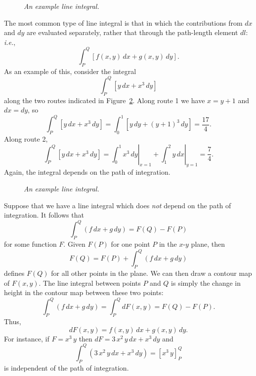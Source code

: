 \begin{figure}
\epsfysize=1.75in
\centerline{}
\caption{\em An example line integral.}\label{f11}
\end{figure}

The most common type of line integral is that in which the contributions from $dx$ and $dy$ are evaluated
separately, rather that through the path-length element $dl$: {\em i.e.}, 
\begin{equation}
\int_P^Q \left[ f(x,y)\,dx + g(x,y)\,dy\right].
\end{equation}
As an example of this, consider the integral
\begin{equation}
\int_P^Q \left[ y\,dx + x^3\,dy\right]
\end{equation}
along the two routes indicated in Figure~\ref{f12}.
Along route 1 we have $x=y+1$ and $dx=dy$, so
\begin{equation}
\int_P^Q \left[ y\,dx + x^3\,dy\right]= \int_{0}^1\left[y\,dy + (y+1)^3\,dy\right] = \frac{17}{4}.
\end{equation}
Along route 2,
\begin{equation}
\int_P^Q \left[ y\,dx + x^3\,dy\right]= \left.\int_0^1 x^3\,dy\right|_{x=1} + \left.\int_1^2 y\,dx\right|_{y=1} = \frac{7}{4}.
\end{equation}
Again, the integral depends on the path of integration. 

\begin{figure}
\epsfysize=1.75in
\centerline{}
\caption{\em An example line integral.}\label{f12}
\end{figure}

Suppose that we have a line integral which does {\em not}\/ depend on the path of integration. It
follows that
\begin{equation}
\int_P^Q \left(f\,dx + g\,dy\right) = F(Q) - F(P)
\end{equation}
for some function $F$. Given $F(P)$ for one point $P$ in the $x$-$y$ plane, then
\begin{equation}
F(Q) = F(P) + \int_P^Q \left(f\,dx + g\,dy\right)
\end{equation}
defines $F(Q)$ for all other points in the plane. We can then draw a contour map of $F(x,y)$.
The line integral between points $P$ and $Q$ is simply the change in height in the contour
map between these two points:
\begin{equation}
\int_P^Q \left(f\,dx + g\,dy\right) = \int_P^Q dF(x,y) = F(Q) - F(P).
\end{equation}
Thus,
\begin{equation}
dF(x,y) = f(x,y)\,dx + g(x,y)\,dy.
\end{equation}
For instance, if $F=x^3\,y$ then $dF= 3\,x^2\,y\,dx + x^3\,dy$ and 
\begin{equation}
\int_P^Q \left(3\,x^2\,y\,dx + x^3\,dy\right) = \left[x^3\,y\right]_P^Q 
\end{equation}
is independent of the path of integration. 

